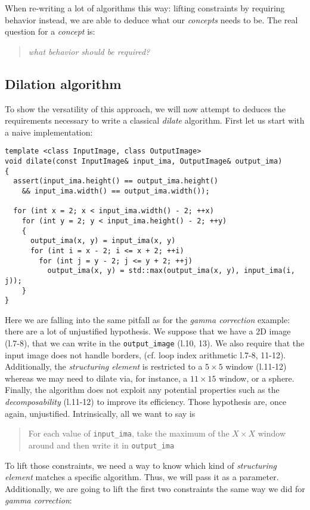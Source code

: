 \noindent When re-writing a lot of algorithms this way: lifting constraints by requiring behavior instead, we are able
to deduce what our \emph{concepts} needs to be. The real question for a \emph{concept} is: \blockquote{\emph{what
    behavior should be required?}}



\subsection{Dilation algorithm}
\label{image_and_algorithms_taxonomy.rewriting.subsec.dilation}

To show the versatility of this approach, we will now attempt to deduces the requirements necessary to write a classical
\emph{dilate} algorithm. First let us start with a naive implementation:

\begin{verbatim}
template <class InputImage, class OutputImage>
void dilate(const InputImage& input_ima, OutputImage& output_ima)
{
  assert(input_ima.height() == output_ima.height()
    && input_ima.width() == output_ima.width());

  for (int x = 2; x < input_ima.width() - 2; ++x)
    for (int y = 2; y < input_ima.height() - 2; ++y)
    {
      output_ima(x, y) = input_ima(x, y)
      for (int i = x - 2; i <= x + 2; ++i)
        for (int j = y - 2; j <= y + 2; ++j)
          output_ima(x, y) = std::max(output_ima(x, y), input_ima(i, j));
    }
}
\end{verbatim}

\noindent Here we are falling into the same pitfall as for the \emph{gamma correction} example: there are a lot of
unjustified hypothesis. We suppose that we have a 2D image (l.7-8), that we can write in the \texttt{output\_image}
(l.10, 13). We also require that the input image does not handle borders, (cf. loop index arithmetic l.7-8, 11-12).
Additionally, the \emph{structuring element} is restricted to a $5 \times 5$ window (l.11-12) whereas we may need to
dilate via, for instance, a $11 \times 15$ window, or a sphere. Finally, the algorithm does not exploit any potential
properties such as the \emph{decomposability} (l.11-12) to improve its efficiency. Those hypothesis are, once again,
unjustified. Intrinsically, all we want to say is \blockquote{For each value of \texttt{input\_ima}, take the maximum
  of the $X \times X$ window around and then write it in \texttt{output\_ima}}.

To lift those constraints, we need a way to know which kind of \emph{structuring element} matches a specific algorithm.
Thus, we will pass it as a parameter. Additionally, we are going to lift the first two constraints the same way we did
for \emph{gamma correction}:

